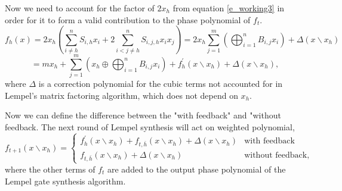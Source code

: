 \documentclass{article}
\theoremstyle{definition}
\theoremstyle{problem}
\theoremstyle{lemma}
\begin{document}
		Now we need to account for the factor of $2x_h$ from equation \ref{e_working3} in order for it to form a valid contribution to the phase polynomial of $f_t$.
		\begin{equation}
		f_h(x) = 2x_h\left(\sum_{i\neq h}^n S_{i,h} x_i + 2\sum_{i<j\neq h}^n S_{i,j,h}x_i x_j\right) = 2x_h\sum_{j=1}^m\left(\bigoplus_{i=1}^n B_{i,j}x_i\right) + \Delta(x\backslash x_h)
		\end{equation}		
		\begin{equation}
		\label{e_working4}
		= mx_h+\sum_{j=1}^m\left(x_h\oplus\bigoplus_{i=1}^n B_{i,j}x_i\right)+ f^\prime_h(x\backslash x_h) + \Delta(x\backslash x_h),
		\end{equation}
		where $\Delta$ is a correction polynomial for the cubic terms not accounted for in Lempel's matrix factoring algorithm, which does not depend on $x_h$.
		
		Now we can define the difference between the "with feedback" and "without feedback. The next round of Lempel synthesis will act on weighted polynomial,
		\begin{equation}
		f_{t+1}(x\backslash x_h) = \left\{\begin{array}{ll}
		f^\prime_h(x\backslash x_h)  + f_{t,\bar{h}}(x\backslash x_h) + \Delta(x\backslash x_h)& \text{with feedback}\\
		f_{t,\bar{h}}(x\backslash x_h) + \Delta(x\backslash x_h)& \text{without feedback},
		\end{array}\right.
		\end{equation}
		where the other terms of $f_t$ are added to the output phase polynomial of the Lempel gate synthesis algorithm.
		
		
\end{document}
